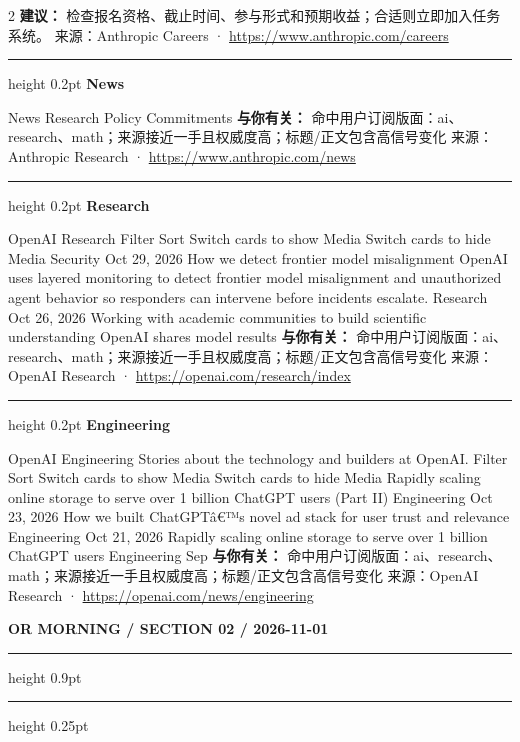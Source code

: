 \documentclass[10.5pt]{ctexart}
\begin{document}
\begin{multicols}{2}
\textbf{建议：} 检查报名资格、截止时间、参与形式和预期收益；合适则立即加入任务系统。
{\footnotesize\color{ormuted} 来源：Anthropic Careers · \url{https://www.anthropic.com/careers}}
\vspace{2mm}
\hrule height 0.2pt
\vspace{2mm}
{\large\bfseries News}\par
News Research Policy Commitments
\textbf{与你有关：} 命中用户订阅版面：ai、research、math；来源接近一手且权威度高；标题/正文包含高信号变化
{\footnotesize\color{ormuted} 来源：Anthropic Research · \url{https://www.anthropic.com/news}}
\vspace{2mm}
\hrule height 0.2pt
\vspace{2mm}
{\large\bfseries Research}\par
OpenAI Research Filter Sort Switch cards to show Media Switch cards to hide Media Security Oct 29, 2026 How we detect frontier model misalignment OpenAI uses layered monitoring to detect frontier model misalignment and unauthorized agent behavior so responders can intervene before incidents escalate. Research Oct 26, 2026 Working with academic communities to build scientific understanding OpenAI shares model results 
\textbf{与你有关：} 命中用户订阅版面：ai、research、math；来源接近一手且权威度高；标题/正文包含高信号变化
{\footnotesize\color{ormuted} 来源：OpenAI Research · \url{https://openai.com/research/index}}
\vspace{2mm}
\hrule height 0.2pt
\vspace{2mm}
{\large\bfseries Engineering}\par
OpenAI Engineering Stories about the technology and builders at OpenAI. Filter Sort Switch cards to show Media Switch cards to hide Media Rapidly scaling online storage to serve over 1 billion ChatGPT users (Part II) Engineering Oct 23, 2026 How we built ChatGPTâ€™s novel ad stack for user trust and relevance Engineering Oct 21, 2026 Rapidly scaling online storage to serve over 1 billion ChatGPT users Engineering Sep
\textbf{与你有关：} 命中用户订阅版面：ai、research、math；来源接近一手且权威度高；标题/正文包含高信号变化
{\footnotesize\color{ormuted} 来源：OpenAI Research · \url{https://openai.com/news/engineering}}
\end{multicols}
\newpage
{\small\bfseries OR MORNING / SECTION 02 / 2026-11-01}
\vspace{2mm}
\hrule height 0.9pt
\vspace{1.5mm}
\hrule height 0.25pt
\vspace{4mm}
\end{document}
